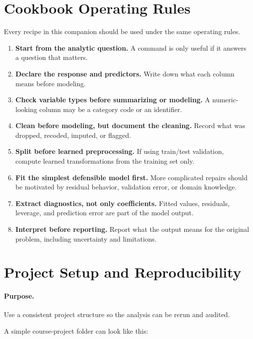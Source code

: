 \section{Cookbook Operating Rules}
\label{app:cookbook-operating-rules}

Every recipe in this companion should be used under the same operating rules.

\begin{enumerate}
  \item \textbf{Start from the analytic question.}  A command is only useful if it answers a question that matters.
  \item \textbf{Declare the response and predictors.}  Write down what each column means before modeling.
  \item \textbf{Check variable types before summarizing or modeling.}  A numeric-looking column may be a category code or an identifier.
  \item \textbf{Clean before modeling, but document the cleaning.}  Record what was dropped, recoded, imputed, or flagged.
  \item \textbf{Split before learned preprocessing.}  If using train/test validation, compute learned transformations from the training set only.
  \item \textbf{Fit the simplest defensible model first.}  More complicated repairs should be motivated by residual behavior, validation error, or domain knowledge.
  \item \textbf{Extract diagnostics, not only coefficients.}  Fitted values, residuals, leverage, and prediction error are part of the model output.
  \item \textbf{Interpret before reporting.}  Report what the output means for the original problem, including uncertainty and limitations.
\end{enumerate}

\section{Project Setup and Reproducibility}
\label{app:cookbook-project-setup}

\paragraph{Purpose.} Use a consistent project structure so the analysis can be rerun and audited.

A simple course-project folder can look like this:


